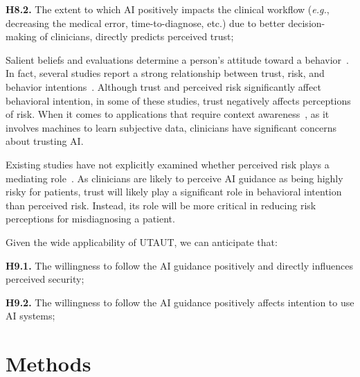 \noindent
{\bf H8.2.} The extent to which AI positively impacts the clinical workflow ({\it e.g.}, decreasing the medical error, time-to-diagnose, etc.) due to better decision-making of clinicians, directly predicts perceived trust;

\vspace{2.25mm}

Salient beliefs and evaluations determine a person's attitude toward a behavior~\cite{KHALILZADEH2017460}.
In fact, several studies report a strong relationship between trust, risk, and behavior intentions~\cite{GANSSER2021101535, 9197782, https://doi.org/10.1002/mar.20823}.
Although trust and perceived risk significantly affect behavioral intention, in some of these studies, trust negatively affects perceptions of risk.
When it comes to applications that require context awareness~\cite{10.1145/3313831.3376506}, as it involves machines to learn subjective data, clinicians have significant concerns about trusting AI.

Existing studies have not explicitly examined whether perceived risk plays a mediating role~\cite{AMEEN2021106548}.
As clinicians are likely to perceive AI guidance as being highly risky for patients, trust will likely play a significant role in behavioral intention than perceived risk.
Instead, its role will be more critical in reducing risk perceptions for misdiagnosing a patient.

\vspace{2.25mm}

\noindent
Given the wide applicability of UTAUT, we can anticipate that:

\vspace{2.25mm}

\noindent
{\bf H9.1.} The willingness to follow the AI guidance positively and directly influences perceived security;

\vspace{2.25mm}

\noindent
{\bf H9.2.} The willingness to follow the AI guidance positively affects intention to use AI systems;

\section{Methods}
\label{sec:chap004004}

